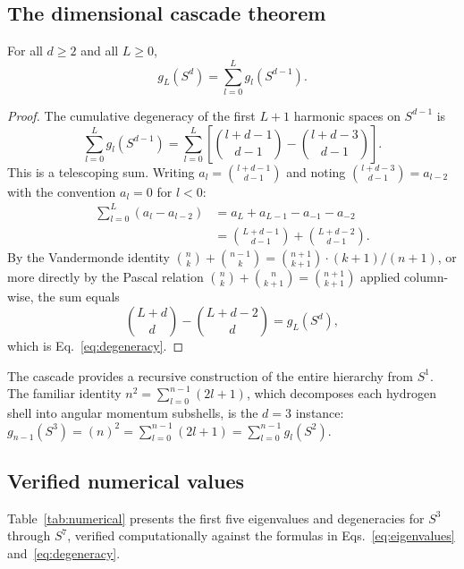 \documentclass[twocolumn,pra,amsmath,amssymb,superscriptaddress]{revtex4-2}
\begin{document}
\subsection{The dimensional cascade theorem}

\begin{theorem}
\label{thm:cascade}
For all $d \geq 2$ and all $L \geq 0$,
\begin{equation}
g_L(S^d) = \sum_{l=0}^{L} g_l(S^{d-1}).
\label{eq:cascade}
\end{equation}
\end{theorem}

\begin{proof}
The cumulative degeneracy of the first $L+1$ harmonic spaces on
$S^{d-1}$ is
\begin{equation}
\sum_{l=0}^{L} g_l(S^{d-1}) = \sum_{l=0}^{L}
\left[\binom{l+d-1}{d-1} - \binom{l+d-3}{d-1}\right].
\end{equation}
This is a telescoping sum.  Writing $a_l = \binom{l+d-1}{d-1}$ and
noting $\binom{l+d-3}{d-1} = a_{l-2}$ with the convention
$a_l = 0$ for $l < 0$:
\begin{align}
\sum_{l=0}^{L} (a_l - a_{l-2})
&= a_L + a_{L-1} - a_{-1} - a_{-2} \nonumber \\
&= \binom{L+d-1}{d-1} + \binom{L+d-2}{d-1}.
\end{align}
By the Vandermonde identity $\binom{n}{k} + \binom{n-1}{k} =
\binom{n+1}{k+1} \cdot (k+1)/(n+1)$, or more directly by the
Pascal relation $\binom{n}{k} + \binom{n}{k+1} = \binom{n+1}{k+1}$
applied column-wise, the sum equals
\begin{equation}
\binom{L+d}{d} - \binom{L+d-2}{d} = g_L(S^d),
\end{equation}
which is Eq.~\eqref{eq:degeneracy}.
\end{proof}

The cascade provides a recursive construction of the entire
hierarchy from $S^1$.  The familiar identity
$n^2 = \sum_{l=0}^{n-1}(2l+1)$, which decomposes each hydrogen
shell into angular momentum subshells, is the $d=3$ instance:
$g_{n-1}(S^3) = (n)^2 = \sum_{l=0}^{n-1}(2l+1) =
\sum_{l=0}^{n-1} g_l(S^2)$.

\subsection{Verified numerical values}

Table~\ref{tab:numerical} presents the first five eigenvalues and
degeneracies for $S^3$ through $S^7$, verified computationally
against the formulas in Eqs.~\eqref{eq:eigenvalues}
and~\eqref{eq:degeneracy}.
\end{document}
